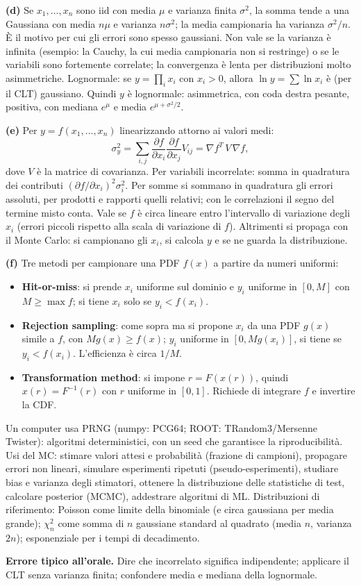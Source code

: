 \documentclass[11pt,a4paper]{article}
\newcommand{\Trap}[1]{\par\smallskip\noindent\textbf{Errore tipico all'orale.} #1\par}
\begin{document}
{\textbf{(d)} Se $x_1,\dots,x_n$ sono iid con media $\mu$ e varianza finita $\sigma^2$, la somma tende a una Gaussiana con media $n\mu$ e varianza $n\sigma^2$; la media campionaria ha varianza $\sigma^2/n$. \`E il motivo per cui gli errori sono spesso gaussiani.
Non vale se la varianza \`e infinita (esempio: la Cauchy, la cui media campionaria non si restringe) o se le variabili sono fortemente correlate; la convergenza \`e lenta per distribuzioni molto asimmetriche.
Lognormale: se $y=\prod_i x_i$ con $x_i>0$, allora $\ln y=\sum\ln x_i$ \`e (per il CLT) gaussiano. Quindi $y$ \`e lognormale: asimmetrica, con coda destra pesante, positiva, con mediana $e^{\mu}$ e media $e^{\mu+\sigma^2/2}$.

\textbf{(e)} Per $y=f(x_1,\dots,x_n)$ linearizzando attorno ai valori medi:
\[
\sigma_y^2=\sum_{i,j}\frac{\partial f}{\partial x_i}\frac{\partial f}{\partial x_j}V_{ij}
=\nabla f^T\,V\,\nabla f ,
\]
dove $V$ \`e la matrice di covarianza. Per variabili incorrelate: somma in quadratura dei contributi $(\partial f/\partial x_i)^2\sigma_i^2$. Per somme si sommano in quadratura gli errori assoluti, per prodotti e rapporti quelli relativi; con le correlazioni il segno del termine misto conta.
Vale se $f$ \`e circa lineare entro l'intervallo di variazione degli $x_i$ (errori piccoli rispetto alla scala di variazione di $f$). Altrimenti si propaga con il Monte Carlo: si campionano gli $x_i$, si calcola $y$ e se ne guarda la distribuzione.

\textbf{(f)} Tre metodi per campionare una PDF $f(x)$ a partire da numeri uniformi:
\begin{itemize}
\item \textbf{Hit-or-miss}: si prende $x_i$ uniforme sul dominio e $y_i$ uniforme in $[0,M]$ con $M\ge\max f$; si tiene $x_i$ solo se $y_i<f(x_i)$.
\item \textbf{Rejection sampling}: come sopra ma si propone $x_i$ da una PDF $g(x)$ simile a $f$, con $M g(x)\ge f(x)$; $y_i$ uniforme in $[0,Mg(x_i)]$, si tiene se $y_i<f(x_i)$. L'efficienza \`e circa $1/M$.
\item \textbf{Transformation method}: si impone $r=F(x(r))$, quindi $x(r)=F^{-1}(r)$ con $r$ uniforme in $[0,1]$. Richiede di integrare $f$ e invertire la CDF.
\end{itemize}
Un computer usa PRNG (numpy: PCG64; ROOT: TRandom3/Mersenne Twister): algoritmi deterministici, con un seed che garantisce la riproducibilit\`a.
Usi del MC: stimare valori attesi e probabilit\`a (frazione di campioni), propagare errori non lineari, simulare esperimenti ripetuti (pseudo-esperimenti), studiare bias e varianza degli stimatori, ottenere la distribuzione delle statistiche di test, calcolare posterior (MCMC), addestrare algoritmi di ML.
Distribuzioni di riferimento: Poisson come limite della binomiale (e circa gaussiana per media grande); $\chi^2_n$ come somma di $n$ gaussiane standard al quadrato (media $n$, varianza $2n$); esponenziale per i tempi di decadimento.
}
\Trap{Dire che incorrelato significa indipendente; applicare il CLT senza varianza finita; confondere media e mediana della lognormale.}
\end{document}
